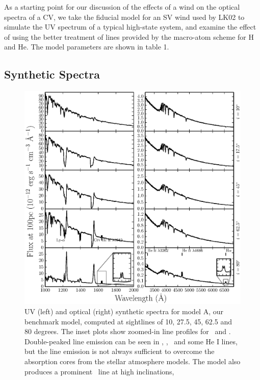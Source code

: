 \documentclass[preprint, a4paper, 11pt]{aastex}
\begin{document}
{As a starting point for our discussion of the effects of a wind on the optical spectra of a CV, we 
take the fiducial model for an SV wind used by LK02 to simulate the UV spectrum of a typical high-state system,
and examine the effect of using the better treatment of lines provided
by the macro-atom scheme for H and He.
The model parameters are shown in table 1. 

\subsection{Synthetic Spectra}

\begin{figure} %
\includegraphics[width=\textwidth]{figures/fig5_uv_opt.eps}
\caption{
UV (left) and optical (right) synthetic spectra for model A, our benchmark model,
computed at sightlines of 10, 27.5, 45, 62.5 and 80 degrees.	
The inset plots show zoomed-in line profiles for 
\heiiuv\ and \ha. Double-peaked line emission can be seen in 
\heiiuv, \heiiopt, \ha\ and some He I lines, but the 
line emission is not always sufficient to overcome the absorption
cores from the stellar atmosphere models. The model
also produces a prominent \heiioptnew\ line at high inclinations,
}
\label{spec}
\end{figure} %

}
\end{document}

